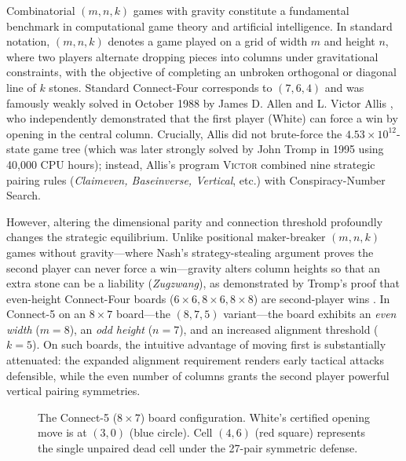 \documentclass[11pt,reqno]{amsart}
\theoremstyle{plain}
\theoremstyle{definition}
\theoremstyle{remark}
\begin{document}
Combinatorial $(m, n, k)$ games with gravity constitute a fundamental benchmark in computational game theory and artificial intelligence. In standard notation, $(m, n, k)$ denotes a game played on a grid of width $m$ and height $n$, where two players alternate dropping pieces into columns under gravitational constraints, with the objective of completing an unbroken orthogonal or diagonal line of $k$ stones. Standard Connect-Four corresponds to $(7, 6, 4)$ and was famously weakly solved in October 1988 by James D. Allen \cite{allen1990complete} and L. Victor Allis \cite{allis1988knowledge,allis1994searching}, who independently demonstrated that the first player (White) can force a win by opening in the central column. Crucially, Allis did not brute-force the $4.53 \times 10^{12}$-state game tree (which was later strongly solved by John Tromp \cite{tromp1995fhourstones} in 1995 using 40,000 CPU hours); instead, Allis's program \textsc{Victor} combined nine strategic pairing rules (\emph{Claimeven, Baseinverse, Vertical}, etc.) with Conspiracy-Number Search.

However, altering the dimensional parity and connection threshold profoundly changes the strategic equilibrium. Unlike positional maker-breaker $(m,n,k)$ games without gravity---where Nash's strategy-stealing argument proves the second player can never force a win---gravity alters column heights so that an extra stone can be a liability (\emph{Zugzwang}), as demonstrated by Tromp's proof that even-height Connect-Four boards ($6 \times 6, 8 \times 6, 8 \times 8$) are second-player wins \cite{tromp1995fhourstones}. In Connect-5 on an $8 \times 7$ board---the $(8, 7, 5)$ variant---the board exhibits an \emph{even width} ($m = 8$), an \emph{odd height} ($n = 7$), and an increased alignment threshold ($k = 5$). On such boards, the intuitive advantage of moving first is substantially attenuated: the expanded alignment requirement renders early tactical attacks defensible, while the even number of columns grants the second player powerful vertical pairing symmetries.

\begin{figure}[t]
\centering
{}
\caption{The Connect-5 ($8 \times 7$) board configuration. White's certified opening move is at $(3, 0)$ (blue circle). Cell $(4, 6)$ (red square) represents the single unpaired dead cell under the 27-pair symmetric defense.}
\label{fig:board_overview}
\end{figure}
\end{document}
